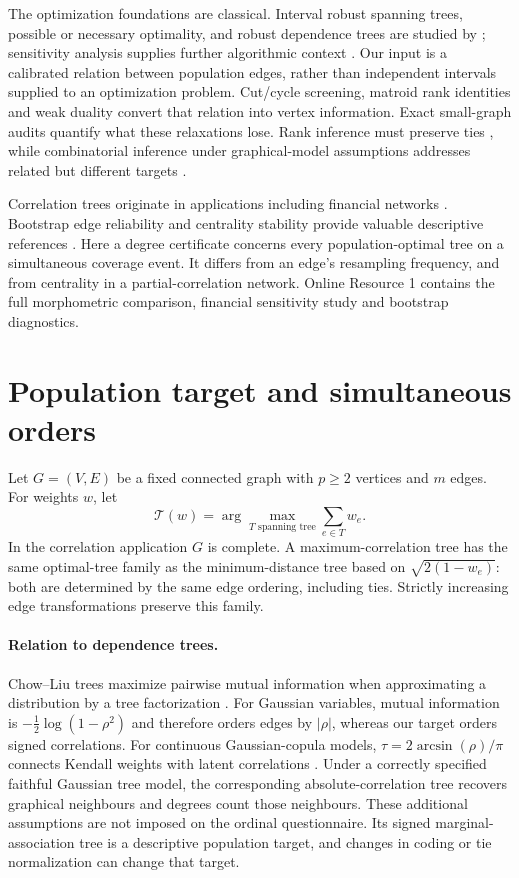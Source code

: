 \documentclass[11pt]{article}
\theoremstyle{plain}
\theoremstyle{definition}\newtheorem{remark}{Remark}\newtheorem{example}{Example}
\newcommand{\T}{\mathcal T}\newcommand{\Pp}{\mathbb P}\newcommand{\E}{\mathbb E}\newcommand{\ind}{\mathbf1}
\begin{document}
The optimization foundations are classical. Interval robust spanning trees, possible or necessary optimality, and robust dependence trees are studied by \citet{yaman2001,kasperski2007,fortin2007,zaffalon2005}; sensitivity analysis supplies further algorithmic context \citep{pettie2015}. Our input is a calibrated relation between population edges, rather than independent intervals supplied to an optimization problem. Cut/cycle screening, matroid rank identities and weak duality convert that relation into vertex information. Exact small-graph audits quantify what these relaxations lose. Rank inference must preserve ties \citep{hall2009,mogstad2024}, while combinatorial inference under graphical-model assumptions addresses related but different targets \citep{neykov2019}.

Correlation trees originate in applications including financial networks \citep{mantegna1999,galazka2011}. Bootstrap edge reliability and centrality stability provide valuable descriptive references \citep{tumminello2007,musciotto2018,epskamp2018}. Here a degree certificate concerns every population-optimal tree on a simultaneous coverage event. It differs from an edge's resampling frequency, and from centrality in a partial-correlation network. Online Resource 1 contains the full morphometric comparison, financial sensitivity study and bootstrap diagnostics.
\section{Population target and simultaneous orders}
Let $G=(V,E)$ be a fixed connected graph with $p\ge2$ vertices and $m$ edges. For weights $w$, let
\[
 \T(w)=\arg\max_{T\text{ spanning tree}}\sum_{e\in T}w_e.
\]
In the correlation application $G$ is complete. A maximum-correlation tree has the same optimal-tree family as the minimum-distance tree based on $\sqrt{2(1-w_e)}$: both are determined by the same edge ordering, including ties. Strictly increasing edge transformations preserve this family.

\paragraph{Relation to dependence trees.}
Chow--Liu trees maximize pairwise mutual information when approximating a distribution by a tree factorization \citep{chow1968}. For Gaussian variables, mutual information is $-\tfrac12\log(1-\rho^2)$ and therefore orders edges by $|\rho|$, whereas our target orders signed correlations. For continuous Gaussian-copula models, $\tau=2\arcsin(\rho)/\pi$ connects Kendall weights with latent correlations \citep{liu2012}. Under a correctly specified faithful Gaussian tree model, the corresponding absolute-correlation tree recovers graphical neighbours and degrees count those neighbours. These additional assumptions are not imposed on the ordinal questionnaire. Its signed marginal-association tree is a descriptive population target, and changes in coding or tie normalization can change that target.
\end{document}
